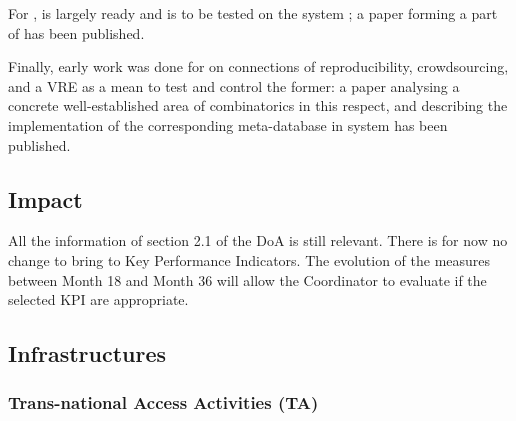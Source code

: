 \documentclass{deliverablereport}
\begin{document}
\begin{itemize}
For ,
 is largely ready and is to
be tested on the system \Sage; a paper
\cite{Pavlou:2016:MCI:2936924.2936934} forming a part of
 has been published.

Finally, early work was done for
 on connections of
reproducibility, crowdsourcing, and a VRE as a mean to test and
control the former: a paper \cite{2016arXiv160100181C} analysing a
concrete well-established area of combinatorics in this respect, and
describing the implementation of the corresponding meta-database in
\Sage system has been published.

\subsection{Impact}

All the information of section 2.1 of the DoA is still relevant. There is for now no change to bring to Key Performance Indicators. The evolution of the measures between Month 18 and Month 36 will allow the Coordinator to evaluate if the selected KPI are appropriate.

\subsection{Infrastructures}

\subsubsection{Trans-national Access Activities (TA)}




\end{itemize}
\end{document}
